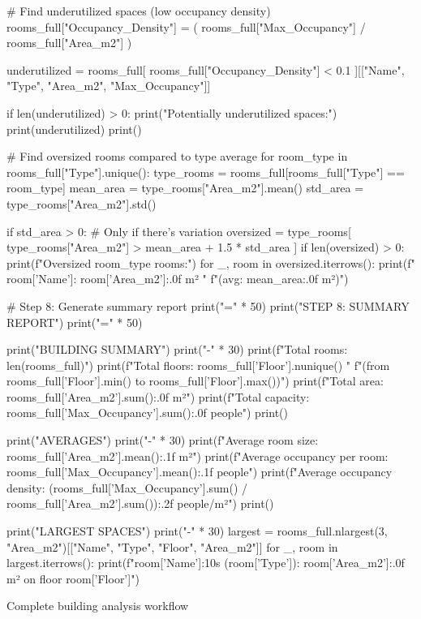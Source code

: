 {    # Find underutilized spaces (low occupancy density)
    rooms_full["Occupancy_Density"] = (
        rooms_full["Max_Occupancy"] / rooms_full["Area_m2"]
    )
    
    underutilized = rooms_full[
        rooms_full["Occupancy_Density"] < 0.1
    ][["Name", "Type", "Area_m2", "Max_Occupancy"]]
    
    if len(underutilized) > 0:
        print("Potentially underutilized spaces:")
        print(underutilized)
    print()
    
    # Find oversized rooms compared to type average
    for room_type in rooms_full["Type"].unique():
        type_rooms = rooms_full[rooms_full["Type"] == room_type]
        mean_area = type_rooms["Area_m2"].mean()
        std_area = type_rooms["Area_m2"].std()
        
        if std_area > 0:  # Only if there's variation
            oversized = type_rooms[
                type_rooms["Area_m2"] > mean_area + 1.5 * std_area
            ]
            if len(oversized) > 0:
                print(f"Oversized {room_type} rooms:")
                for _, room in oversized.iterrows():
                    print(f"  {room['Name']}: {room['Area_m2']:.0f} m² "
                          f"(avg: {mean_area:.0f} m²)")
    
    # Step 8: Generate summary report
    print("=" * 50)
    print("STEP 8: SUMMARY REPORT")
    print("=" * 50)
    
    print("BUILDING SUMMARY")
    print("-" * 30)
    print(f"Total rooms: {len(rooms_full)}")
    print(f"Total floors: {rooms_full['Floor'].nunique()} "
          f"(from {rooms_full['Floor'].min()} to {rooms_full['Floor'].max()})")
    print(f"Total area: {rooms_full['Area_m2'].sum():.0f} m²")
    print(f"Total capacity: {rooms_full['Max_Occupancy'].sum():.0f} people")
    print()
    
    print("AVERAGES")
    print("-" * 30)
    print(f"Average room size: {rooms_full['Area_m2'].mean():.1f} m²")
    print(f"Average occupancy per room: {rooms_full['Max_Occupancy'].mean():.1f} people")
    print(f"Average occupancy density: {(rooms_full['Max_Occupancy'].sum() / rooms_full['Area_m2'].sum()):.2f} people/m²")
    print()
    
    print("LARGEST SPACES")
    print("-" * 30)
    largest = rooms_full.nlargest(3, "Area_m2")[["Name", "Type", "Floor", "Area_m2"]]
    for _, room in largest.iterrows():
        print(f"{room['Name']:10s} ({room['Type']}): {room['Area_m2']:.0f} m² on floor {room['Floor']}")
    
}{Complete building analysis workflow}

